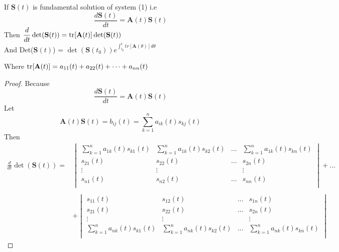 \newpage
\begin{theorem}[]
    If $\mathbf{S}(t)$ is fundamental solution of system (1) i.e
    \[
        \frac{d\mathbf{S}(t)}{dt} = \mathbf{A}(t)\mathbf{S}(t)
    \]
    Then $\displaystyle \frac{d}{dt}\det(\mathbf{S}(t)) = \trace[\mathbf{A}(t)] \det(\mathbf{S}(t))$
    \\
    And Det($\mathbf{S}(t)$) = $ \det(\mathbf{S}(t_0))e^{\textstyle \int_{t_0}^{t}tr[\mathbf{A}(\theta)]d\theta}$
    \par
    Where $\trace[\mathbf{A}(t)] = a_{11}(t) + a_{22}(t) + \dots + a_{nn}(t)$
\end{theorem}
\begin{proof}[\textcolor{theme}{Proof}]
    Because
    \[
        \frac{d\mathbf{S}(t)}{dt} = \mathbf{A}(t)\mathbf{S}(t)
    \]
    Let
    \[
        \mathbf{A}(t)\mathbf{S}(t) = b_{ij}(t) = \sum_{k=1}^{n} a_{ik}(t)s_{kj}(t)
    \]
    Then
    \begin{align*}
        \frac{d}{dt} \det(\mathbf{S}(t))
        = &
        \begin{vmatrix}
            \sum_{k=1}^{n} a_{1k}(t)s_{k1}(t) & \sum_{k=1}^{n} a_{1k}(t)s_{k2}(t) & \dots & \sum_{k=1}^{n} a_{1k}(t)s_{kn}(t) \\
            s_{21}(t)                         & s_{22}(t)                         & \dots & s_{2n}(t)                         \\
            \vdots                            & \vdots                            &       & \vdots                            \\
            s_{n1}(t)                         & s_{n2}(t)                         & \dots & s_{nn}(t)                         \\
        \end{vmatrix}
        +
        \dots
        \\
        \\
          & +
        \begin{vmatrix}
            s_{11}(t)                         & s_{12}(t)                         & \dots & s_{1n}(t)                         \\
            s_{21}(t)                         & s_{22}(t)                         & \dots & s_{2n}(t)                         \\
            \vdots                            & \vdots                            &       & \vdots                            \\
            \sum_{k=1}^{n} a_{nk}(t)s_{k1}(t) & \sum_{k=1}^{n} a_{nk}(t)s_{k2}(t) & \dots & \sum_{k=1}^{n} a_{nk}(t)s_{kn}(t) \\

\end{vmatrix}
\end{align*}
\end{proof}
